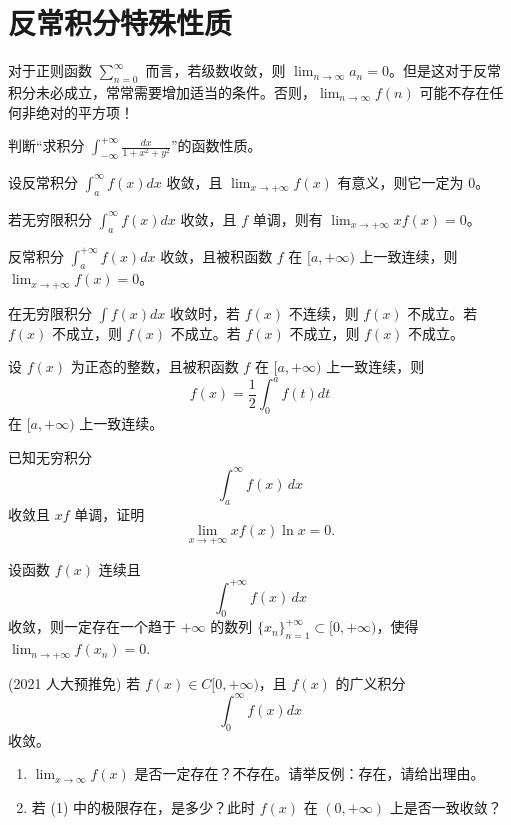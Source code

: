 \documentclass[lang=cn,10pt,thmcnt=section]{elegantbook}
\begin{document}
\section{反常积分特殊性质}
对于正则函数 \(\sum_{n=0}^{\infty}\) 而言，若级数收敛，则 \(\lim_{n \to \infty} a_n = 0\)。但是这对于反常积分未必成立，常常需要增加适当的条件。否则，\(\lim_{n \to \infty} f(n)\) 可能不存在任何非绝对的平方项！
\begin{example}
	判断“求积分 \(\int_{-\infty}^{+\infty} \frac{dx}{1 + x^2 + y^2}\)”的函数性质。
\end{example}
\begin{example}
	设反常积分 \(\int_{a}^{\infty} f(x) dx\) 收敛，且 \(\lim_{x \to +\infty} f(x)\) 有意义，则它一定为 0。
\end{example}
\begin{example}
	
	若无穷限积分 \(\int_{a}^{\infty} f(x) dx\) 收敛，且 \(f\) 单调，则有 \(\lim_{x \to +\infty} x f(x) = 0\)。

\end{example}
\begin{example}
	反常积分 \(\int_a^{+\infty} f(x) dx\) 收敛，且被积函数 \(f\) 在 \([a, +\infty)\) 上一致连续，则 \(\lim_{x \to +\infty} f(x) = 0\)。

\end{example}
\begin{remark}
	在无穷限积分 \( \int f(x) dx \) 收敛时，若 \( f(x) \) 不连续，则 \( f(x) \) 不成立。若 \( f(x) \) 不成立，则 \( f(x) \) 不成立。若 \( f(x) \) 不成立，则 \( f(x) \) 不成立。
	\end{remark}
\begin{example}
	设 \( f(x) \) 为正态的整数，且被积函数 \( f \) 在 \([a,+\infty)\) 上一致连续，则
\[
f(x) = \frac{1}{2} \int_0^a f(t) dt
\]
在 \([a,+\infty)\) 上一致连续。
\end{example}
\begin{example}
	已知无穷积分 
\[
\int_{a}^{\infty} f(x) \, dx
\] 
收敛且 \( xf \) 单调，证明 
\[
\lim_{x \to +\infty} xf(x)\ln x = 0.
\]
\end{example}
\begin{example}
	设函数 \( f(x) \) 连续且 
\[
\int_{0}^{+\infty} f(x) \, dx
\] 
收敛，则一定存在一个趋于 \( +\infty \) 的数列 \(\{x_n\}_{n=1}^{+\infty} \subset [0, +\infty)\)，使得 \(\lim_{n \to +\infty} f(x_n) = 0\).

\end{example}
\begin{example}
	(2021 人大预推免) 若 \( f(x) \in C[0, +\infty) \)，且 \( f(x) \) 的广义积分 
\[
\int_0^\infty f(x) dx
\] 
收敛。

\begin{enumerate}
\item $\lim_{x \to \infty} f(x)$ 是否一定存在？不存在。请举反例：存在，请给出理由。
\item 若 (1) 中的极限存在，是多少？此时 \( f(x) \) 在 \((0, +\infty)\) 上是否一致收敛？
\end{enumerate}
\end{example}
\end{document}
